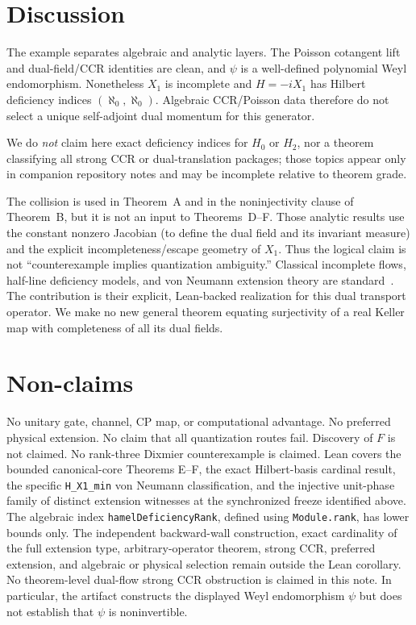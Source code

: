 ﻿\documentclass[11pt]{article}
\begin{document}
\section{Discussion}
The example separates algebraic and analytic layers. The Poisson cotangent lift and dual-field/CCR identities are clean, and \(\psi\) is a well-defined polynomial Weyl endomorphism. Nonetheless \(X_1\) is incomplete and \(H=-iX_1\) has Hilbert deficiency indices \((\aleph_0,\aleph_0)\). Algebraic CCR/Poisson data therefore do not select a unique self-adjoint dual momentum for this generator.

We do \emph{not} claim here exact deficiency indices for \(H_0\) or \(H_2\), nor a theorem classifying all strong CCR or dual-translation packages; those topics appear only in companion repository notes and may be incomplete relative to theorem grade.

The collision is used in Theorem~A and in the noninjectivity clause of
Theorem~B, but it is not an input to Theorems~D--F. Those analytic results use
the constant nonzero Jacobian (to define the dual field and its invariant
measure) and the explicit incompleteness/escape geometry of \(X_1\). Thus the
logical claim is not ``counterexample implies quantization ambiguity.''
Classical incomplete flows, half-line deficiency models, and von Neumann
extension theory are standard~\cite{RS2}. The contribution is their explicit,
Lean-backed realization for this dual transport operator. We make no new
general theorem equating surjectivity of a real Keller map with completeness
of all its dual fields.

\section{Non-claims}
No unitary gate, channel, CP map, or computational advantage. No preferred
physical extension. No claim that all quantization routes fail. Discovery of
\(F\) is not claimed. No rank-three Dixmier counterexample is claimed. Lean
covers the bounded canonical-core Theorems E--F, the exact Hilbert-basis
cardinal result, the specific \texttt{H\_X1\_min} von Neumann classification,
and the injective unit-phase family of distinct extension witnesses at the
synchronized freeze identified above. The algebraic index
\texttt{hamelDeficiency}\allowbreak\texttt{Rank}, defined using
\texttt{Module.rank}, has lower bounds only.
The independent backward-wall construction, exact cardinality of the full
extension type, arbitrary-operator theorem, strong CCR, preferred extension,
and algebraic or physical selection remain outside the Lean corollary. No
theorem-level dual-flow strong CCR obstruction is claimed in this note.
In particular, the artifact constructs the displayed Weyl endomorphism
\(\psi\) but does not establish that \(\psi\) is noninvertible.
\end{document}
